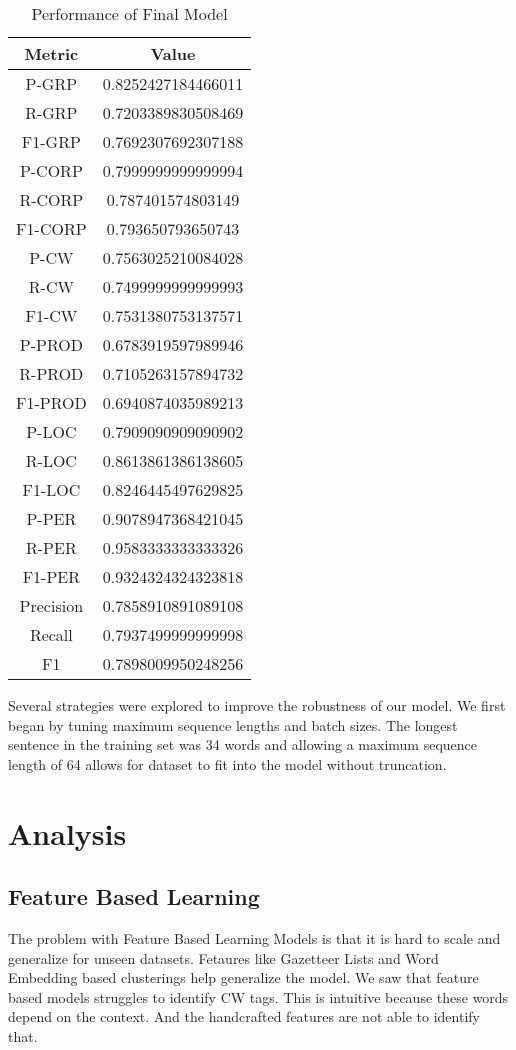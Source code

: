 \documentclass{article}
\begin{document}
\begin{table*}[t]
\centering
\begin{tabular}{|c|c|}
\hline
\textbf{Metric} & \textbf{Value}  \\ \hline
P-GRP & 0.8252427184466011 \\ \hline
R-GRP & 0.7203389830508469 \\ \hline
F1-GRP & 0.7692307692307188 \\ \hline
P-CORP & 0.7999999999999994 \\ \hline
R-CORP & 0.787401574803149 \\ \hline
F1-CORP & 0.793650793650743 \\ \hline
P-CW & 0.7563025210084028 \\ \hline
R-CW & 0.7499999999999993 \\ \hline
F1-CW & 0.7531380753137571 \\ \hline
P-PROD & 0.6783919597989946 \\ \hline
R-PROD & 0.7105263157894732 \\ \hline
F1-PROD & 0.6940874035989213 \\ \hline
P-LOC & 0.7909090909090902 \\ \hline
R-LOC & 0.8613861386138605 \\ \hline
F1-LOC & 0.8246445497629825 \\ \hline
P-PER & 0.9078947368421045 \\ \hline
R-PER & 0.9583333333333326 \\ \hline
F1-PER & 0.9324324324323818 \\ \hline
Precision & 0.7858910891089108 \\ \hline
Recall & 0.7937499999999998 \\ \hline
F1 & 0.7898009950248256 \\ \hline
\end{tabular}
\caption{Performance of Final Model}
\label{tab:F1_Final}
\end{table*}

Several strategies were explored to improve the robustness of our model. We first began by tuning maximum sequence lengths and batch sizes. The longest sentence in the training set was 34 words and allowing a maximum sequence length of 64 allows for dataset to fit into the model without truncation.
\section{Analysis}
\subsection{Feature Based Learning}
The problem with Feature Based Learning Models is that it is hard to scale and generalize for unseen datasets. Fetaures like Gazetteer Lists and Word Embedding based clusterings help generalize the model. We saw that feature based models struggles to identify CW tags. This is intuitive because these words depend on the context. And the handcrafted features are not able to identify that.  
\end{document}
